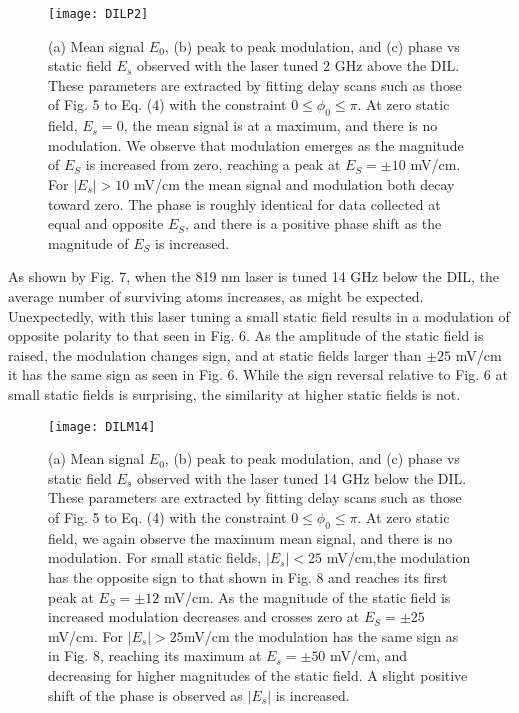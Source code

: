 \documentclass[aps,pra,preprint,groupedaddress]{revtex4-1}
\begin{document}
\begin{figure}
	\texttt{[image: DILP2]}
	\caption{(a) Mean signal $E_0$, (b) peak to peak modulation, and (c) phase vs static field $E_s$ observed with the laser tuned 2 GHz above the DIL. These parameters are extracted by fitting delay scans such as those of Fig. 5 to Eq. (4) with the constraint $0\leq\phi_0\leq\pi$. At zero static field, $E_s=0$, the mean signal is at a maximum, and there is no modulation. We observe that modulation emerges as the magnitude of $E_S$ is increased from zero, reaching a peak at $E_S = \pm 10$ mV/cm. For $|E_s|>10$ mV/cm the mean signal and modulation both decay toward zero. The phase is roughly identical for data collected at equal and opposite $E_S$, and there is a positive phase shift as the magnitude of $E_S$ is increased.}
	\label{fig:DILP2}
\end{figure}


As shown by Fig. 7, when the 819 nm laser is tuned 14 GHz below the DIL, the average number of surviving atoms increases, as might be expected. Unexpectedly, with this laser tuning a small static field results in a modulation of opposite polarity to that seen in Fig. 6. As the amplitude of the static field is raised, the modulation changes sign, and at static fields larger than $\pm25$ mV/cm it has the same sign as seen in Fig. 6. While the sign reversal relative to Fig. 6 at small static fields is surprising, the similarity at higher static fields is not.


\begin{figure}
	\texttt{[image: DILM14]}
	\caption{(a) Mean signal $E_0$, (b) peak to peak modulation, and (c) phase vs static field $E_s$ observed with the laser tuned 14 GHz below the DIL. These parameters are extracted by fitting delay scans such as those of Fig. 5 to Eq. (4) with the constraint $0\leq\phi_0\leq\pi$. At zero static field, we again observe the maximum mean signal, and there is no modulation. For small static fields, $|E_s|<25$ mV/cm,the modulation has the opposite sign to that shown in Fig. 8 and reaches its first peak at $E_S = \pm 12$ mV/cm. As the magnitude of the static field is increased modulation decreases and crosses zero at $E_S = \pm 25$ mV/cm. For $|E_s|> 25$mV/cm the modulation has the same sign as in Fig. 8, reaching its maximum at $E_s=\pm50$ mV/cm, and decreasing for higher magnitudes of the static field. A slight positive shift of the phase is observed as $|E_s|$ is increased.}
	\label{fig:DILM14}
\end{figure}
\end{document}
